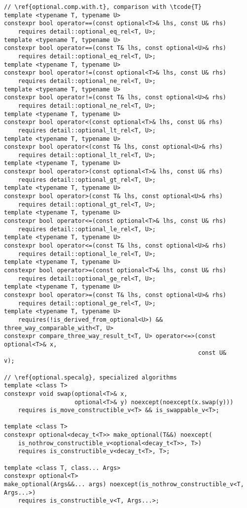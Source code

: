 \documentclass[a4paper,10pt,oneside,openany,final,article]{memoir}
\begin{document}
\begin{verbatim}
// \ref{optional.comp.with.t}, comparison with \tcode{T}
template <typename T, typename U>
constexpr bool operator==(const optional<T>& lhs, const U& rhs)
    requires detail::optional_eq_rel<T, U>;
template <typename T, typename U>
constexpr bool operator==(const T& lhs, const optional<U>& rhs)
    requires detail::optional_eq_rel<T, U>;
template <typename T, typename U>
constexpr bool operator!=(const optional<T>& lhs, const U& rhs)
    requires detail::optional_ne_rel<T, U>;
template <typename T, typename U>
constexpr bool operator!=(const T& lhs, const optional<U>& rhs)
    requires detail::optional_ne_rel<T, U>;
template <typename T, typename U>
constexpr bool operator<(const optional<T>& lhs, const U& rhs)
    requires detail::optional_lt_rel<T, U>;
template <typename T, typename U>
constexpr bool operator<(const T& lhs, const optional<U>& rhs)
    requires detail::optional_lt_rel<T, U>;
template <typename T, typename U>
constexpr bool operator>(const optional<T>& lhs, const U& rhs)
    requires detail::optional_gt_rel<T, U>;
template <typename T, typename U>
constexpr bool operator>(const T& lhs, const optional<U>& rhs)
    requires detail::optional_gt_rel<T, U>;
template <typename T, typename U>
constexpr bool operator<=(const optional<T>& lhs, const U& rhs)
    requires detail::optional_le_rel<T, U>;
template <typename T, typename U>
constexpr bool operator<=(const T& lhs, const optional<U>& rhs)
    requires detail::optional_le_rel<T, U>;
template <typename T, typename U>
constexpr bool operator>=(const optional<T>& lhs, const U& rhs)
    requires detail::optional_ge_rel<T, U>;
template <typename T, typename U>
constexpr bool operator>=(const T& lhs, const optional<U>& rhs)
    requires detail::optional_ge_rel<T, U>;
template <typename T, typename U>
    requires(!is_derived_from_optional<U>) && three_way_comparable_with<T, U>
constexpr compare_three_way_result_t<T, U> operator<=>(const optional<T>& x,
                                                       const U&           v);

// \ref{optional.specalg}, specialized algorithms
template <class T>
constexpr void swap(optional<T>& x,
                    optional<T>& y) noexcept(noexcept(x.swap(y)))
    requires is_move_constructible_v<T> && is_swappable_v<T>;

template <class T>
constexpr optional<decay_t<T>> make_optional(T&&) noexcept(
    is_nothrow_constructible_v<optional<decay_t<T>>, T>)
    requires is_constructible_v<decay_t<T>, T>;

template <class T, class... Args>
constexpr optional<T>
make_optional(Args&&... args) noexcept(is_nothrow_constructible_v<T, Args...>)
    requires is_constructible_v<T, Args...>;


\end{verbatim}
\end{document}
